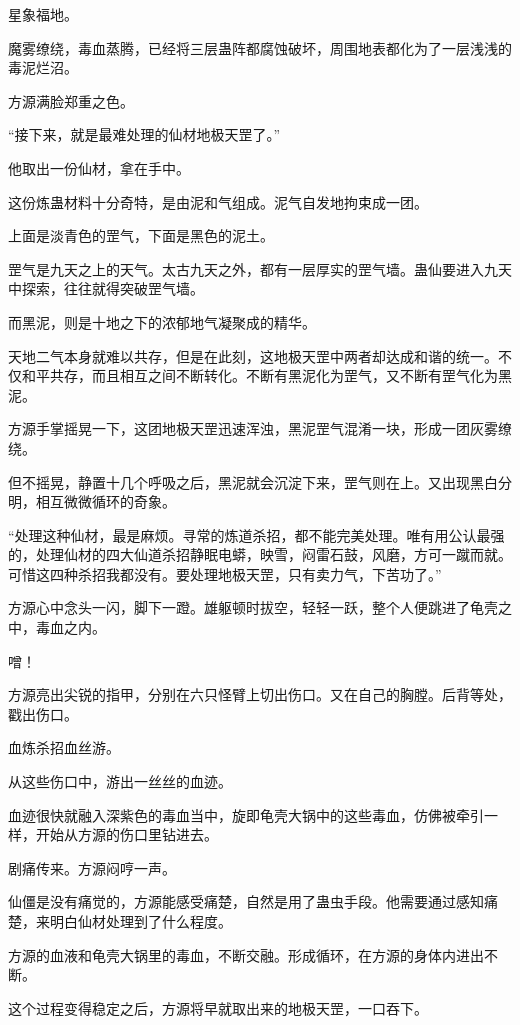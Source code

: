 
\begin{this_body}

星象福地。

魔雾缭绕，毒血蒸腾，已经将三层蛊阵都腐蚀破坏，周围地表都化为了一层浅浅的毒泥烂沼。

方源满脸郑重之色。

“接下来，就是最难处理的仙材地极天罡了。”

他取出一份仙材，拿在手中。

这份炼蛊材料十分奇特，是由泥和气组成。泥气自发地拘束成一团。

上面是淡青色的罡气，下面是黑色的泥土。

罡气是九天之上的天气。太古九天之外，都有一层厚实的罡气墙。蛊仙要进入九天中探索，往往就得突破罡气墙。

而黑泥，则是十地之下的浓郁地气凝聚成的精华。

天地二气本身就难以共存，但是在此刻，这地极天罡中两者却达成和谐的统一。不仅和平共存，而且相互之间不断转化。不断有黑泥化为罡气，又不断有罡气化为黑泥。

方源手掌摇晃一下，这团地极天罡迅速浑浊，黑泥罡气混淆一块，形成一团灰雾缭绕。

但不摇晃，静置十几个呼吸之后，黑泥就会沉淀下来，罡气则在上。又出现黑白分明，相互微微循环的奇象。

“处理这种仙材，最是麻烦。寻常的炼道杀招，都不能完美处理。唯有用公认最强的，处理仙材的四大仙道杀招静眠电蟒，映雪，闷雷石鼓，风磨，方可一蹴而就。可惜这四种杀招我都没有。要处理地极天罡，只有卖力气，下苦功了。”

方源心中念头一闪，脚下一蹬。雄躯顿时拔空，轻轻一跃，整个人便跳进了龟壳之中，毒血之内。

噌！

方源亮出尖锐的指甲，分别在六只怪臂上切出伤口。又在自己的胸膛。后背等处，戳出伤口。

血炼杀招血丝游。

从这些伤口中，游出一丝丝的血迹。

血迹很快就融入深紫色的毒血当中，旋即龟壳大锅中的这些毒血，仿佛被牵引一样，开始从方源的伤口里钻进去。

剧痛传来。方源闷哼一声。

仙僵是没有痛觉的，方源能感受痛楚，自然是用了蛊虫手段。他需要通过感知痛楚，来明白仙材处理到了什么程度。

方源的血液和龟壳大锅里的毒血，不断交融。形成循环，在方源的身体内进出不断。

这个过程变得稳定之后，方源将早就取出来的地极天罡，一口吞下。


\end{this_body}
